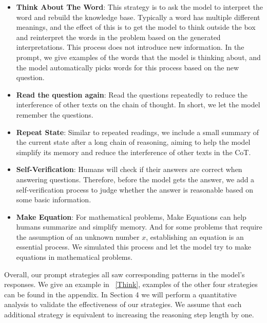 \documentclass[11pt]{article}
\begin{document}
\begin{itemize}[leftmargin=*]\setlength\itemsep{-0.3em}
\item
\textbf{Think About The Word}: This strategy is to ask the model to interpret the word and rebuild the knowledge base. Typically a word has multiple different meanings, and the effect of this is to get the model to think outside the box and reinterpret the words in the problem based on the generated interpretations. This process does not introduce new information. In the prompt, we give examples of the words that the model is thinking about, and the model automatically picks words for this process based on the new question.

\item
\textbf{Read the question again}: Read the questions repeatedly to reduce the interference of other texts on the chain of thought. In short, we let the model remember the questions.

\item
\textbf{Repeat State}: Similar to repeated readings, we include a small summary of the current state after a long chain of reasoning, aiming to help the model simplify its memory and reduce the interference of other texts in the CoT.

\item
\textbf{Self-Verification}: Humans will check if their answers are correct when answering questions. Therefore, before the model gets the answer, we add a self-verification process to judge whether the answer is reasonable based on some basic information.

\item
\textbf{Make Equation}: For mathematical problems, Make Equations can help humans summarize and simplify memory. And for some problems that require the assumption of an unknown number $x$, establishing an equation is an essential process. We simulated this process and let the model try to make equations in mathematical problems.
\end{itemize}

Overall, our prompt strategies all saw corresponding patterns in the model's responses. We give an example in ~\autoref{Think}, examples of the other four strategies can be found in the appendix. In Section 4 we will perform a quantitative analysis to validate the effectiveness of our strategies. We assume that each additional strategy is equivalent to increasing the reasoning step length by one.


\phantom{Invisible Text}
\vspace{-\baselineskip}
\end{document}
